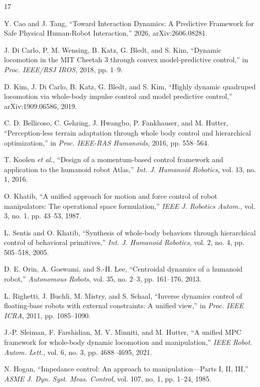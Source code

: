 \documentclass[journal]{IEEEtran}
\theoremstyle{plain}
\theoremstyle{definition}
\begin{document}
\begin{thebibliography}{17}

 Y. Cao and J. Tang, ``Toward Interaction Dynamics: A Predictive Framework for Safe Physical Human-Robot Interaction,'' 2026, arXiv:2606.08281.

 J. Di Carlo, P. M. Wensing, B. Katz, G. Bledt, and S. Kim, ``Dynamic locomotion in the MIT Cheetah 3 through convex model-predictive control,'' in \emph{Proc. IEEE/RSJ IROS}, 2018, pp. 1--9.

 D. Kim, J. Di Carlo, B. Katz, G. Bledt, and S. Kim, ``Highly dynamic quadruped locomotion via whole-body impulse control and model predictive control,'' arXiv:1909.06586, 2019.

 C. D. Bellicoso, C. Gehring, J. Hwangbo, P. Fankhauser, and M. Hutter, ``Perception-less terrain adaptation through whole body control and hierarchical optimization,'' in \emph{Proc. IEEE-RAS Humanoids}, 2016, pp. 558--564.

 T. Koolen \emph{et al.}, ``Design of a momentum-based control framework and application to the humanoid robot Atlas,'' \emph{Int. J. Humanoid Robotics}, vol. 13, no. 1, 2016.

 O. Khatib, ``A unified approach for motion and force control of robot manipulators: The operational space formulation,'' \emph{IEEE J. Robotics Autom.}, vol. 3, no. 1, pp. 43--53, 1987.

 L. Sentis and O. Khatib, ``Synthesis of whole-body behaviors through hierarchical control of behavioral primitives,'' \emph{Int. J. Humanoid Robotics}, vol. 2, no. 4, pp. 505--518, 2005.

 D. E. Orin, A. Goswami, and S.-H. Lee, ``Centroidal dynamics of a humanoid robot,'' \emph{Autonomous Robots}, vol. 35, no. 2--3, pp. 161--176, 2013.

 L. Righetti, J. Buchli, M. Mistry, and S. Schaal, ``Inverse dynamics control of floating-base robots with external constraints: A unified view,'' in \emph{Proc. IEEE ICRA}, 2011, pp. 1085--1090.

 J.-P. Sleiman, F. Farshidian, M. V. Minniti, and M. Hutter, ``A unified MPC framework for whole-body dynamic locomotion and manipulation,'' \emph{IEEE Robot. Autom. Lett.}, vol. 6, no. 3, pp. 4688--4695, 2021.

 N. Hogan, ``Impedance control: An approach to manipulation---Parts I, II, III,'' \emph{ASME J. Dyn. Syst. Meas. Control}, vol. 107, no. 1, pp. 1--24, 1985.


\end{thebibliography}
\end{document}
